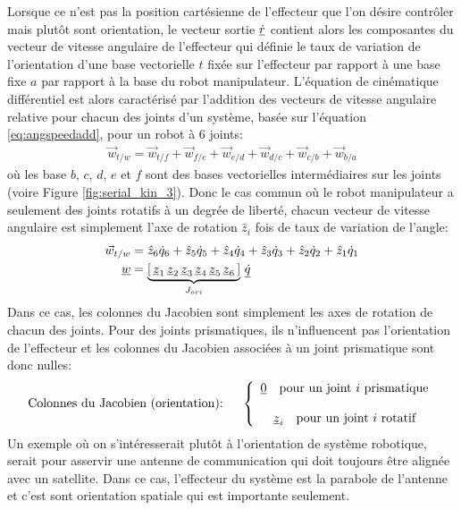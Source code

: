 Lorsque ce n'est pas la position cartésienne de l'effecteur que l'on désire contrôler mais plutôt sont orientation, le vecteur sortie $\underline{\dot{r}}$ contient alors les composantes du vecteur de vitesse angulaire de l'effecteur qui définie le taux de variation de l'orientation d'une base vectorielle $t$ fixée sur l'effecteur par rapport à une base fixe $a$ par rapport à la base du robot manipulateur. L'équation de cinématique différentiel est alors caractérisé par l'addition des vecteurs de vitesse angulaire relative pour chacun des joints d'un système, basée sur l'équation \eqref{eq:angspeedadd}, pour un robot à 6 joints:
\begin{align}
\vec{w}_{t/w} = \vec{w}_{t/f} + \vec{w}_{f/e} + \vec{w}_{e/d} + \vec{w}_{d/c} + \vec{w}_{c/b} + \vec{w}_{b/a} 
\end{align}
où les base $b$, $c$, $d$, $e$ et $f$ sont des bases vectorielles intermédiaires sur les joints (voire Figure \ref{fig:serial_kin_3}).
Donc le cas commun où le robot manipulateur a seulement des joints rotatifs à un degrée de liberté, chacun vecteur de vitesse angulaire est simplement l'axe de rotation $\hat{z}_i$ fois de taux de variation de l'angle: 
\begin{align}
\vec{w}_{t/w} &= \hat{z}_6 \dot{q}_6 +  \hat{z}_5 \dot{q}_5 +  \hat{z}_4 \dot{q}_4 +  \hat{z}_3 \dot{q}_3 +  \hat{z}_2 \dot{q}_2 +  \hat{z}_1 \dot{q}_1 \\
\underline{w} &= 
\underbrace{
\left[ \, \underline{z}_1 \, \underline{z}_2 \, \underline{z}_3 \, \underline{z}_4 \, \underline{z}_5 \, \underline{z}_6 \, \right]  
}_{J_{ori}}
\, \underline{\dot{q}} 
\end{align}
Dans ce cas, les colonnes du Jacobien sont simplement les axes de rotation de chacun des joints. Pour des joints prismatiques, ils n'influencent pas l'orientation de l'effecteur et les colonnes du Jacobien associées à un joint prismatique sont donc nulles:
\begin{equation}
\text{Colonnes du Jacobien (orientation): } \quad\left\{ \begin{array}{c}
\underline{0} \quad \text{pour un joint $i$ prismatique}
 \\ \\
\underline{z}_i \quad \text{pour un joint $i$ rotatif}
\end{array}
\right.
\end{equation}
%
Un exemple où on s'intéresserait plutôt à l'orientation de système robotique, serait pour asservir une antenne de communication qui doit toujours être alignée avec un satellite. Dans ce cas, l'effecteur du système est la parabole de l'antenne et c'est sont orientation spatiale qui est importante seulement. 

